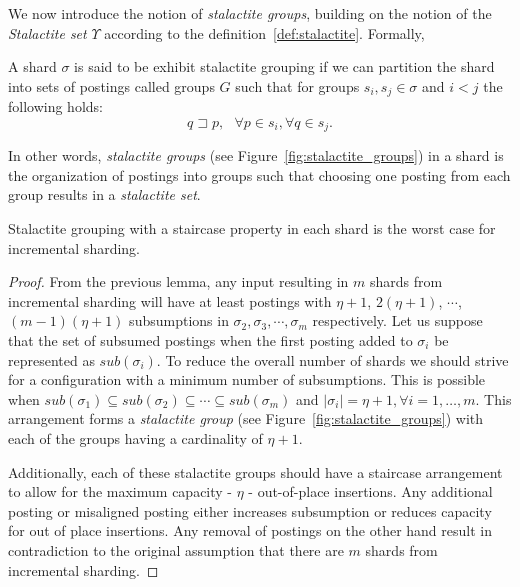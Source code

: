We now introduce the notion of \emph{stalactite groups}, building on the notion of the \emph{Stalactite set} $\Upsilon$ according to the definition~\ref{def:stalactite}. Formally,

\begin{definition}
A shard $\sigma$ is said to be exhibit stalactite grouping if we can partition the shard into sets of postings called groups $G$ such that  for groups $s_i, s_j \in \sigma$ and $i<j$ the following holds:
$$
	q \sqsupset p , \,\,\,\, \forall p \in s_i, \forall q \in s_j.
$$
\end{definition}

In other words, \emph{stalactite groups} (see Figure~\ref{fig:stalactite_groups}) in a shard is the organization of postings into groups such that choosing one posting from each group results in a \emph{stalactite set}.

\begin{lemma}
\label{lemma:stalactite_grouping}
	Stalactite grouping with a staircase property in each shard is the worst case for incremental sharding.
\end{lemma}

\begin{proof}{}
	From the previous lemma, any input resulting in $m$ shards from incremental sharding will have at least postings with $\eta+1$, $2(\eta+1)$, $\cdots$, $(m-1)(\eta+1)$ subsumptions in $\sigma_2, \sigma_3, \cdots, \sigma_m$ respectively. Let us suppose that the set of subsumed postings when the first posting added to $\sigma_i$ be represented as $sub(\sigma_i)$. To reduce the overall number of shards we should strive for a configuration with a minimum number of subsumptions. This is possible when $sub(\sigma_1) \subseteq sub(\sigma_2) \subseteq \cdots \subseteq sub(\sigma_m)$ and $|\sigma_i| = \eta + 1, \forall i = 1,\ldots,m$. This arrangement forms a \emph{stalactite group} (see Figure~\ref{fig:stalactite_groups}) with each of the groups having a cardinality of $\eta+1$.


	Additionally, each of these stalactite groups should have a staircase arrangement to allow for the maximum capacity - $\eta$ - out-of-place insertions. Any additional posting or misaligned posting either increases subsumption or reduces capacity for out of place insertions. Any removal of postings on the other hand result in contradiction to the original assumption that there are $m$ shards from incremental sharding.
\end{proof}


